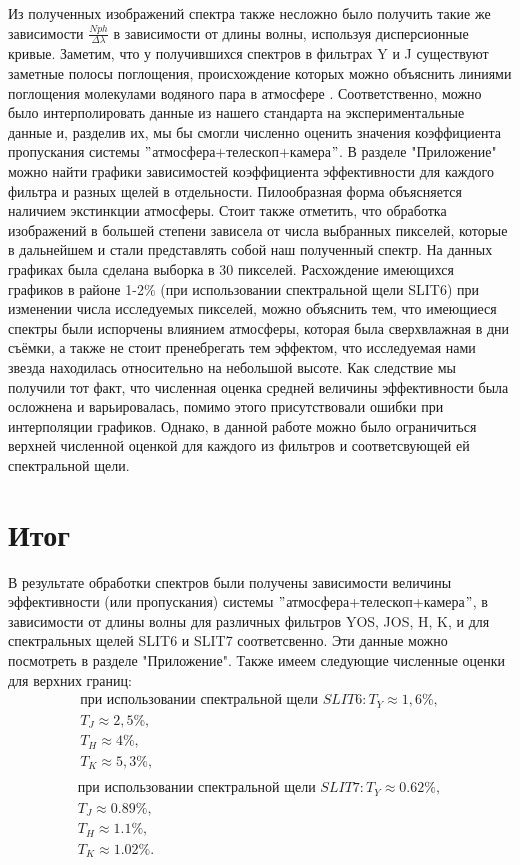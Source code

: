 \documentclass[a4paper]{article}
\begin{document}
Из полученных изображений спектра также несложно было получить такие же зависимости $\frac{Nph}{\Delta\lambda}$ в зависимости от длины волны, используя дисперсионные кривые. Заметим, что у получившихся спектров в фильтрах Y и J существуют заметные полосы поглощения, происхождение которых можно объяснить линиями поглощения молекулами водяного пара в атмосфере \cite{vapour}. Соответственно, можно было интерполировать данные из нашего стандарта на экспериментальные данные и, разделив их, мы бы смогли численно оценить значения коэффициента пропускания системы $"$атмосфера+телескоп+камера$"$. В разделе "Приложение" $ $ можно найти графики зависимостей коэффициента эффективности для каждого фильтра и разных щелей в отдельности. Пилообразная форма объясняется наличием экстинкции атмосферы. Стоит также отметить, что обработка изображений в большей степени зависела от числа выбранных пикселей, которые в дальнейшем и стали представлять собой наш полученный спектр. На данных графиках была сделана выборка в 30 пикселей. Расхождение имеющихся графиков в районе 1-2\% (при использовании спектральной щели SLIT6) при изменении числа исследуемых пикселей, можно объяснить тем, что имеющиеся спектры были испорчены влиянием атмосферы, которая была сверхвлажная в дни съёмки, а также не стоит пренебрегать тем эффектом, что исследуемая нами звезда находилась относительно на небольшой высоте. Как следствие мы получили тот факт, что численная оценка средней величины эффективности была осложнена и варьировалась, помимо этого присутствовали ошибки при интерполяции графиков. Однако, в данной работе можно было ограничиться верхней численной оценкой для каждого из фильтров и соответсвующей ей спектральной щели.

\hfill\break

\section{Итог}
В результате обработки спектров были получены зависимости величины эффективности (или пропускания) системы $"$атмосфера+телескоп+камера$"$, в зависимости от длины волны для различных фильтров YOS, JOS, H, K, и для спектральных щелей SLIT6 и SLIT7 соответсвенно. Эти данные можно посмотреть в разделе "Приложение". Также имеем следующие численные оценки для верхних границ:
\begin{eqnarray*}
\text{при использовании спектральной щели }SLIT6:
T_Y \approx 1,6\%,\\
T_J \approx 2,5\%,\\
T_H \approx 4\%,\\
T_K \approx 5,3\%,\\
\end{eqnarray*}
\begin{eqnarray*}
\text{при использовании спектральной щели }SLIT7:
T_Y \approx 0.62\%,\\
T_J \approx 0.89\%,\\
T_H \approx 1.1\%,\\
T_K \approx 1.02\%.\\
\end{eqnarray*}
\end{document}
